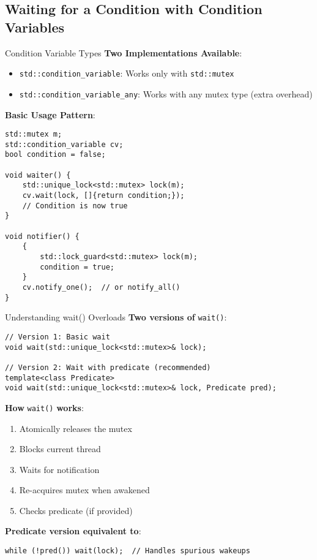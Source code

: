 \subsection{Waiting for a Condition with Condition Variables}
\begin{frame}[fragile]{Condition Variable Types}
	\textbf{Two Implementations Available}:

	\begin{itemize}
		\item \texttt{std::condition\_variable}: Works only with \texttt{std::mutex}
		\item \texttt{std::condition\_variable\_any}: Works with any mutex type (extra overhead)
	\end{itemize}

	\vspace{1em}
	\textbf{Basic Usage Pattern}:
	\begin{verbatim}
std::mutex m;
std::condition_variable cv;
bool condition = false;

void waiter() {
    std::unique_lock<std::mutex> lock(m);
    cv.wait(lock, []{return condition;});
    // Condition is now true
}

void notifier() {
    {
        std::lock_guard<std::mutex> lock(m);
        condition = true;
    }
    cv.notify_one();  // or notify_all()
}
	\end{verbatim}
\end{frame}

\begin{frame}[fragile]{Understanding wait() Overloads}
	\textbf{Two versions of} \texttt{wait()}:

	\begin{verbatim}
// Version 1: Basic wait
void wait(std::unique_lock<std::mutex>& lock);

// Version 2: Wait with predicate (recommended)
template<class Predicate>
void wait(std::unique_lock<std::mutex>& lock, Predicate pred);
	\end{verbatim}

	\vspace{0.5em}
	\textbf{How} \texttt{wait()} \textbf{works}:
	\begin{enumerate}
		\item Atomically releases the mutex
		\item Blocks current thread
		\item Waits for notification
		\item Re-acquires mutex when awakened
		\item Checks predicate (if provided)
	\end{enumerate}

	\vspace{0.5em}
	\textbf{Predicate version equivalent to}:
	\begin{verbatim}
while (!pred()) wait(lock);  // Handles spurious wakeups
	\end{verbatim}
\end{frame}


